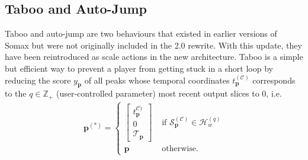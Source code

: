 \subsection{Taboo and Auto-Jump}
Taboo and auto-jump are two behaviours that existed in earlier versions of Somax but were not originally included in the 2.0 rewrite. With this update, they have been reintroduced as scale actions in the new architecture. Taboo is a simple but efficient way to prevent a player from getting stuck in a short loop by reducing the score $y_{\bm p}$ of all peaks whose temporal coordinates $t_{\bm p}^{(\mathcal C)}$ corresponds to the $q \in \mathbb Z_+$ (user-controlled parameter) most recent output slices to 0, i.e.
	\begin{align}
		\bm p^{(\ast)} = \left\lbrace\begin{array}{cl}
				\begin{bmatrix} 
					t^{\mathcal C)}_{\bm p} \\ 0 \\ \mathcal T_{\bm p}
				\end{bmatrix} 
				& \text{ if } \mathcal S^{(\mathcal C)}_{\bm p} \in \mathcal H_w^{(q)}  \\ 
				\bm p & \text{ otherwise}.
			\end{array}\right.
	\end{align}
	
